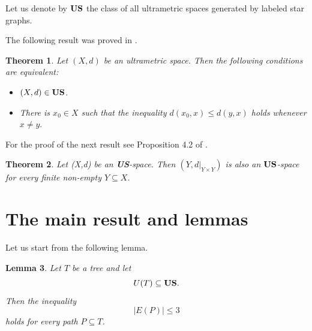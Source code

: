 \documentclass[11pt]{article}
\newtheorem{theorem}{Theorem}[section]
\newtheorem{lemma}[theorem]{Lemma}
\theoremstyle{definition}
\theoremstyle{remark}
\numberwithin{equation}{section}
\begin{document}
Let us denote by ${\bf US}$ the class of all ultrametric spaces generated by labeled star graphs.


The following result was proved in \cite{DR2025USGbLSG}.


\begin{theorem}\label{[2.1]}
Let $(X,d)$ be an ultrametric space. Then the following conditions are equivalent:
\begin{itemize}[left=10pt]
\item[(i)]  $(X,d) \in {\bf US}$.
\item[(ii)]  There is $x_{0} \in X$ such that the inequality $
        d(x_{0},x) \leq d(y,x) $
    holds whenever
$    
        x \neq y. 
        $
\end{itemize}
\end{theorem}


For the proof of the next result see Proposition 4.2 of \cite{DCR2025OJAC}.
\begin{theorem}
\label{8866gh}
Let (X,d) be an {\bf US}-space.
Then $(Y, d|_{Y \times Y})$ is also an ${\bf US}$-space for every finite non-empty $Y \subseteq X$.
\end{theorem}








\section{The main result and lemmas}


Let us start from the following lemma.

\begin{lemma}
    \label{rl}
Let \( T \) be a tree and let 
\begin{equation}
    \label{xa}
 U(T) \subseteq {\bf US}. 
 \end{equation}
Then the inequality
\begin{equation}
    \label{xa2}
|E(P)| \le 3 
\end{equation}
holds for every path \( P \subseteq T \).
\end{lemma}
\end{document}
